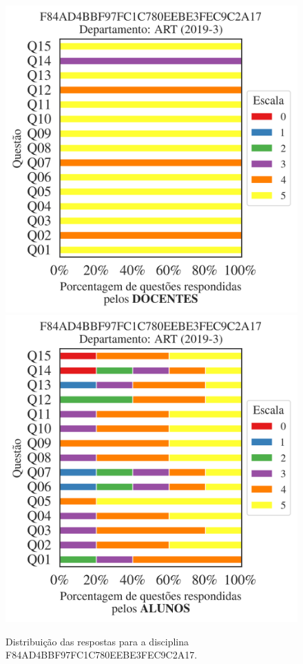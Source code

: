\documentclass[a4paper,10pt]{article}
\begin{document}
\begin{figure}[h]
\centering
\includegraphics[width=0.485\linewidth]{analise_disciplina_departamento_ART_F84AD4BBF97FC1C780EEBE3FEC9C2A17_docentes.png}
\includegraphics[width=0.485\linewidth]{analise_disciplina_departamento_ART_F84AD4BBF97FC1C780EEBE3FEC9C2A17_alunos.png}
\caption{\label{fig:analise_geral_departamento}                Distribuição das respostas para a disciplina F84AD4BBF97FC1C780EEBE3FEC9C2A17. }
\end{figure}
\end{document}
